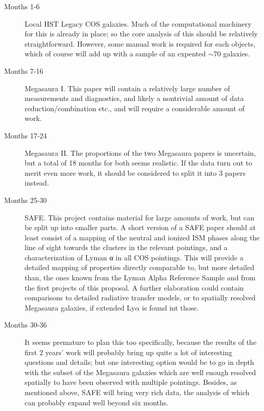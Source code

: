 \documentclass[12pt]{amsart}
\begin{document}
\begin{description}
	\item[Months 1-6] Local HST Legacy COS galaxies. Much of the
		computational machinery for this is already in place; so the
		core analysis of this should be relatively straightforward.
		However, some manual work is required for each objects, which of
		course will add up with a sample of an expented $\sim 70$
		galaxies.
	\item[Months 7-16] Megasaura I. This paper will contain a relatively
		large number of measurements and diagnostics, and likely a
		nontrivial amount of data reduction/combination etc., and will
		require a considerable amount of work.
	\item[Months 17-24] Megasaura II. The proportions of the two Megasaura
		papers is uncertain, but a total of 18 months for both seems
		realistic. If the data turn out to merit even more work, it
		should be considered to split it into 3 papers instead.
	\item[Months 25-30] SAFE. This project contains material for large
		amounts of work, but can be split up into smaller parts. A short
                version of a SAFE paper should at least consist of a mapping of 
		the neutral and ionized ISM phases along the line of sight 
		towards the clusters in the relevant pointings, and a 
		characterization of Lyman α in all COS pointings. This will 
		provide a detailed mapping of properties directly comparable to, 
		but more detailed than, the ones known from the Lyman Alpha 
		Reference Sample and from the first projects of this proposal. A
		further elaboration could contain comparisons to detailed
		radiative transfer models, or to spatially resolved Megasaura
		galaxies, if extended Ly$\alpha$ is found int those. 
	\item[Months 30-36] It seems premature to plan this too specifically,
		because the results of the first 2 years' work will probably
		bring up quite a lot of interesting questions and details; but
		one interesting option would be to go in depth with the subset
		of the Megasaura galaxies which are well enough resolved
		spatially to have been observed with multiple pointings.
		Besides, as mentioned above, SAFE will bring very rich data, the
		analysis of which can probably expand well beyond six months.
\end{description}
\end{document}
